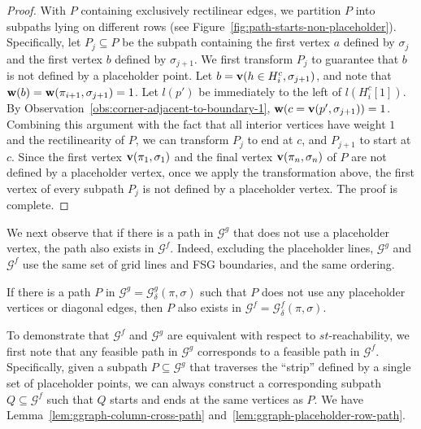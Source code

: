 \documentclass[thm-restate]{lipics-v2021}
\theoremstyle{remark}
\newcommand{\weight}[1]{\normalfont \textbf{w}(#1)}
\newcommand{\graph}[0]{\mathcal{G}}
\newcommand{\doublequote}[1]{``#1''}
\newcommand{\vertex}[1]{\normalfont \textbf{v}(#1)}
\newcommand{\fsgraph}[0]{\graph^{f}}
\newcommand{\ggraph}[0]{\graph^g}
\begin{document}
\begin{proof}
    With $P$ containing exclusively rectilinear edges, we partition $P$ into subpaths lying on different rows (see Figure~\ref{fig:path-starts-non-placeholder}). Specifically, let $P_j \subseteq P$ be the subpath containing the first vertex $a$ defined by $\sigma_j$ and the first vertex $b$ defined by $\sigma_{j + 1}$. We first transform $P_j$ to guarantee that $b$ is not defined by a placeholder point. Let $b = \vertex{h \in H^c_i, \sigma_{j + 1}}$, and note that $\weight{b} = \weight{\pi_{i + 1}, \sigma_{j + 1}} = 1$. Let $l(p')$ be immediately to the left of $l(H^c_i[1])$. By Observation~\ref{obs:corner-adjacent-to-boundary-1}, $\weight{c = \vertex{p', \sigma_{j + 1}}} = 1$. Combining this argument with the fact that all interior vertices have weight $1$ and the rectilinearity of $P$, we can transform $P_j$ to end at $c$, and $P_{j + 1}$ to start at $c$. Since the first vertex $\vertex{\pi_1, \sigma_1}$ and the final vertex $\vertex{\pi_n, \sigma_n}$ of $P$ are not defined by a placeholder vertex, once we apply the transformation above, the first vertex of every subpath $P_j$ is not defined by a placeholder vertex. The proof is complete. 
\end{proof}

We next observe that if there is a path in $\ggraph$ that does not use a placeholder vertex, the path also exists in $\fsgraph$. Indeed, excluding the placeholder lines, $\ggraph$ and $\fsgraph$ use the same set of grid lines and FSG boundaries, and the same ordering. 
\begin{observation} \label{obs:gg-fs-path-in-a-cell}
    If there is a path $P$ in $\ggraph = \ggraph_\delta(\pi, \sigma)$ such that $P$ does not use any placeholder vertices or diagonal edges, then $P$ also exists in $\fsgraph = \fsgraph_\delta(\pi, \sigma)$. 
\end{observation}

To demonstrate that $\fsgraph$ and $\ggraph$ are equivalent with respect to $st$-reachability, we first note that any feasible path in $\ggraph$ corresponds to a feasible path in $\fsgraph$. Specifically, given a subpath $P \subseteq \ggraph$ that traverses the \doublequote{strip} defined by a single set of placeholder points, we can always construct a corresponding subpath $Q \subseteq \fsgraph$ such that $Q$ starts and ends at the same vertices as $P$. We have Lemma~\ref{lem:ggraph-column-cross-path} and~\ref{lem:ggraph-placeholder-row-path}. 
\end{document}
